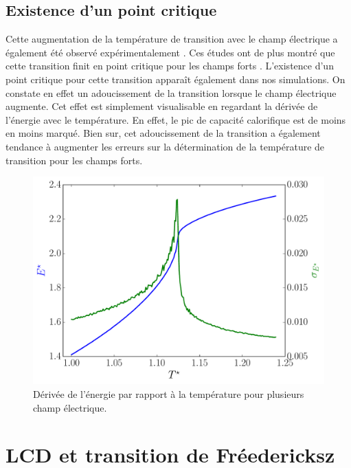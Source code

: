 \documentclass[11pt,a4paper]{article}
\numberwithin{equation}{section}
\begin{document}
\subsection{Existence d'un point critique}
Cette augmentation de la température de transition avec le champ électrique a également été observé expérimentalement \cite{mfieldExperiment,efieldExperiment,efieldExperiment2}. Ces études ont de plus montré que cette transition finit en point critique pour les champs forts \cite{efieldExperiment}. L'existence d'un point critique pour cette transition apparaît également dans nos simulations. On constate en effet un adoucissement de la transition lorsque le champ électrique augmente. Cet effet est simplement visualisable en regardant la dérivée de l'énergie avec le température. En effet, le pic de capacité calorifique est de moins en moins marqué. Bien sur, cet adoucissement de la transition a également tendance à augmenter les erreurs sur la détermination de la température de transition pour les champs forts.
\vspace{2cm}

\begin{figure}[h!]
    \centering	    
	\includegraphics[scale=0.6]{figures/local_energie.pdf}
    \caption{Dérivée de l'énergie par rapport à la température pour plusieurs champ électrique.}
    	\label{deriveenergie} 
\end{figure}

\newpage
\section{LCD et transition de Fréedericksz}
\end{document}
